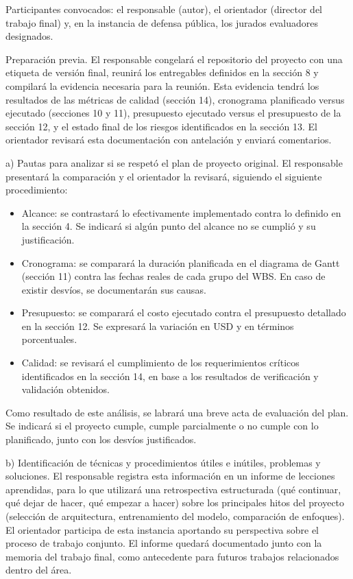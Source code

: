 \documentclass[
11pt, %
]{charter}
\begin{document}
	Participantes convocados: el responsable (autor), el orientador (director del trabajo final) y, en la instancia de defensa pública, los jurados evaluadores designados.
	
	Preparación previa. El responsable congelará el repositorio del proyecto con una etiqueta de versión final, reunirá los entregables definidos en la sección 8 y compilará la evidencia necesaria para la reunión. Esta evidencia tendrá los resultados de las métricas de calidad (sección 14), cronograma planificado versus ejecutado (secciones 10 y 11), presupuesto ejecutado versus el presupuesto de la sección 12, y el estado final de los riesgos identificados en la sección 13. El orientador revisará esta documentación con antelación y enviará comentarios.
	
	a) Pautas para analizar si se respetó el plan de proyecto original. El responsable presentará la comparación y el orientador la revisará, siguiendo el siguiente procedimiento:
	\begin{itemize}
		\item Alcance: se contrastará lo efectivamente implementado contra lo definido en la sección 4. Se indicará si algún punto del alcance no se cumplió y su justificación.
		\item Cronograma: se comparará la duración planificada en el diagrama de Gantt (sección 11) contra las fechas reales de cada grupo del WBS. En caso de existir desvíos, se documentarán sus causas.
		\item Presupuesto: se comparará el costo ejecutado contra el presupuesto detallado en la sección 12. Se expresará la variación en USD y en términos porcentuales.
		\item Calidad: se revisará el cumplimiento de los requerimientos críticos identificados en la sección 14, en base a los resultados de verificación y validación obtenidos.
	\end{itemize}
	Como resultado de este análisis, se labrará una breve acta de evaluación del plan. Se indicará si el proyecto cumple, cumple parcialmente o no cumple con lo planificado, junto con los desvíos justificados.
	
	b) Identificación de técnicas y procedimientos útiles e inútiles, problemas y soluciones. El responsable registra esta información en un informe de lecciones aprendidas, para lo que utilizará una retrospectiva estructurada (qué continuar, qué dejar de hacer, qué empezar a hacer) sobre los principales hitos del proyecto (selección de arquitectura, entrenamiento del modelo, comparación de enfoques). El orientador participa de esta instancia aportando su perspectiva sobre el proceso de trabajo conjunto. El informe quedará documentado junto con la memoria del trabajo final, como antecedente para futuros trabajos relacionados dentro del área.
	
\end{document}
